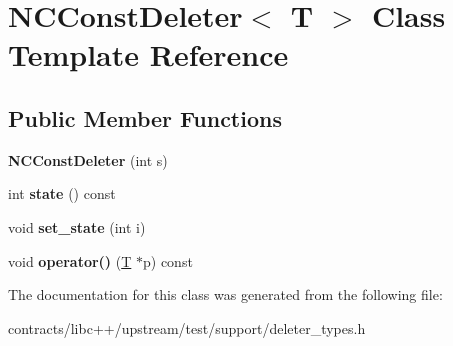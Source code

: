 \hypertarget{class_n_c_const_deleter}{}\section{N\+C\+Const\+Deleter$<$ T $>$ Class Template Reference}
\label{class_n_c_const_deleter}
\subsection*{Public Member Functions}
\begin{DoxyCompactItemize}
\item 
\mbox{\label{class_n_c_const_deleter_a1a54e68cb4e5b4e51fdbac95297505b4}} 
{\bfseries N\+C\+Const\+Deleter} (int s)
\item 
\mbox{\label{class_n_c_const_deleter_af3406d2b438090705ed0ac4e51618cb2}} 
int {\bfseries state} () const
\item 
\mbox{\label{class_n_c_const_deleter_a77bc0bdeee06de32c233e11f47b3be28}} 
void {\bfseries set\+\_\+state} (int i)
\item 
\mbox{\label{class_n_c_const_deleter_a3ef1d2906d2d628d092b839ed3a0ea90}} 
void {\bfseries operator()} (\mbox{\hyperlink{struct_t}{T}} $\ast$p) const
\end{DoxyCompactItemize}


The documentation for this class was generated from the following file\+:\begin{DoxyCompactItemize}
\item 
contracts/libc++/upstream/test/support/deleter\+\_\+types.\+h\end{DoxyCompactItemize}

